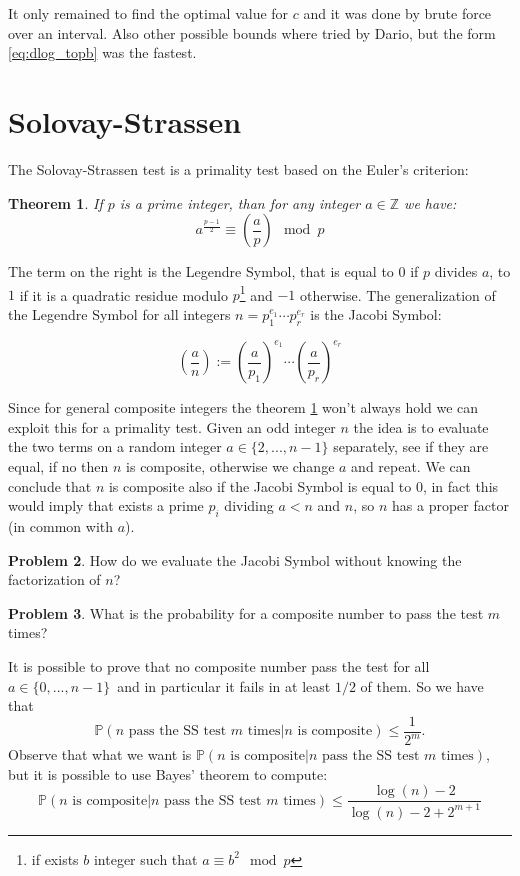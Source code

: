 \documentclass{article}
\newcommand{\ZZ}{\mathbb{Z}}
\newcommand{\PP}{\mathbb{P}}
\theoremstyle{plain}
\newtheorem{teo}{Theorem}[section]
\theoremstyle{remark}
\theoremstyle{definition}
\newtheorem{prob}[teo]{Problem}
\begin{document}
It only remained to find the optimal value for $c$ and it was done by brute force over an interval. Also other possible bounds where tried by Dario, but the form \ref{eq:dlog_topb} was the fastest. 




\section{Solovay-Strassen}

The Solovay-Strassen test is a primality test based on the Euler's criterion:
\begin{teo}\label{teo:eu_quad}
	If $p$ is a prime integer, than for any integer $a \in \ZZ$ we have:
	\[ a^{\frac{p-1}{2}} \equiv \left(\dfrac{a}{p}\right) \mod p \]
\end{teo}

The term on the right is the Legendre Symbol, that is equal to $0$ if $p$ divides $a$, to $1$ if it is a quadratic residue modulo $p$\footnote{if exists $b$ integer such that $a \equiv b^2 \mod p$} and $-1$ otherwise. The generalization of the Legendre Symbol for all integers $n = p_1^{e_1} \cdots p_r^{e_r}$ is the Jacobi Symbol: 

\[ \left(\dfrac{a}{n}\right) := \left(\dfrac{a}{p_1}\right)^{e_1} \cdots \left(\dfrac{a}{p_r}\right)^{e_r} \] 
	
Since for general composite integers the theorem \ref{teo:eu_quad} won't always hold we can exploit this for a primality test. Given an odd integer $n$ the idea is to evaluate the two terms on a random integer $a\in \{2,...,n-1\}$ separately, see if they are equal, if no then $n$ is composite, otherwise we change $a$ and repeat. We can conclude that $n$ is composite also if the Jacobi Symbol is equal to $0$, in fact this would imply that exists a prime $p_i$ dividing $a<n$ and $n$, so $n$ has a proper factor (in common with $a$). 

\begin{prob}\label{prob:jacobi}
	How do we evaluate the Jacobi Symbol without knowing the factorization of $n$?
\end{prob}

\begin{prob}\label{prob:eff_ss}
	What is the probability for a composite number to pass the test $m$ times?
\end{prob}

It is possible to prove that no composite number pass the test for all $a\in\{0,...,n-1\}$ and in particular it fails in at least $1/2$ of them. So we have that 
\begin{equation}
	\label{eq:prob_SS}
\PP(n \text{ pass the SS test }m\text{ times}|n\text{ is composite})\leq \frac{1}{2^m} .
\end{equation}
Observe that what we want is $\PP(n\text{ is composite}|n \text{ pass the SS test }m\text{ times})$, but it is possible to use Bayes' theorem to compute:
\begin{equation}
	\label{eq:prob_SS_good}
	\PP(n\text{ is composite}|n \text{ pass the SS test }m\text{ times})
	\leq
	\frac{\log(n) - 2}{\log(n) - 2 + 2^{m+1}}
\end{equation}
\end{document}
